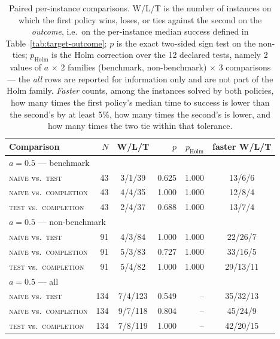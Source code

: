 \begin{table}[t]
\centering
\caption{Paired per-instance comparisons. W/L/T is the number of instances on which the
first policy wins, loses, or ties against the second on the \emph{outcome}, i.e.\ on the
per-instance median success defined in Table~\ref{tab:target-outcome}; $p$ is the exact
two-sided sign test on the non-ties; $p_{\mathrm{Holm}}$ is the Holm correction over the 12
declared tests, namely 2 values of $a$ $\times$ 2 families (benchmark, non-benchmark) $\times$
3 comparisons --- the \emph{all} rows are reported for information only and are not part of the
Holm family. \emph{Faster} counts, among the instances solved by both policies, how many times
the first policy's median time to success is lower than the second's by at least 5\%, how many
times the second's is lower, and how many times the two tie within that tolerance.}
\label{tab:target-paired}
\small
\setlength{\tabcolsep}{5pt}
\begin{tabular}{lrcrrc}
\toprule
Comparison & $N$ & W/L/T & $p$ & $p_{\mathrm{Holm}}$ & faster W/L/T \\
\midrule
\multicolumn{6}{l}{$a=0.5$ --- benchmark} \\
\addlinespace[1pt]
\quad \textsc{naive} vs.\ \textsc{test} & 43 & 3/1/39 & 0.625 & 1.000 & 13/6/6 \\
\quad \textsc{naive} vs.\ \textsc{completion} & 43 & 4/4/35 & 1.000 & 1.000 & 12/8/4 \\
\quad \textsc{test} vs.\ \textsc{completion} & 43 & 2/4/37 & 0.688 & 1.000 & 13/7/4 \\
\midrule
\multicolumn{6}{l}{$a=0.5$ --- non-benchmark} \\
\addlinespace[1pt]
\quad \textsc{naive} vs.\ \textsc{test} & 91 & 4/3/84 & 1.000 & 1.000 & 22/26/7 \\
\quad \textsc{naive} vs.\ \textsc{completion} & 91 & 5/3/83 & 0.727 & 1.000 & 33/16/5 \\
\quad \textsc{test} vs.\ \textsc{completion} & 91 & 5/4/82 & 1.000 & 1.000 & 29/13/11 \\
\midrule
\multicolumn{6}{l}{$a=0.5$ --- all} \\
\addlinespace[1pt]
\quad \textsc{naive} vs.\ \textsc{test} & 134 & 7/4/123 & 0.549 & -- & 35/32/13 \\
\quad \textsc{naive} vs.\ \textsc{completion} & 134 & 9/7/118 & 0.804 & -- & 45/24/9 \\
\quad \textsc{test} vs.\ \textsc{completion} & 134 & 7/8/119 & 1.000 & -- & 42/20/15 \\

\end{tabular}
\end{table}
